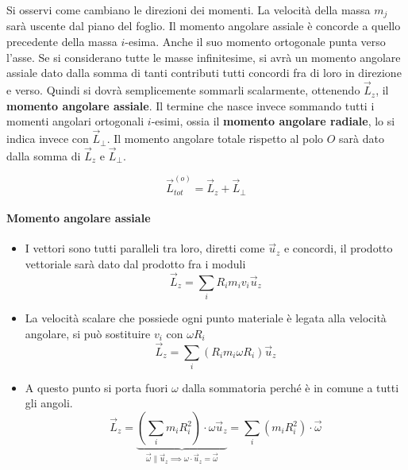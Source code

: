 \begin{figure}[htpb]
\end{figure}
\FloatBarrier
Si osservi come cambiano le direzioni dei momenti. La velocità della massa $m_j$ sarà uscente dal piano del foglio. Il momento angolare assiale è concorde a quello precedente della massa $i$-esima. Anche il suo momento ortogonale punta verso l'asse. Se si considerano tutte le masse infinitesime, si avrà un momento angolare assiale dato dalla somma di tanti contributi tutti concordi fra di loro in direzione e verso. Quindi si dovrà semplicemente sommarli scalarmente, ottenendo $\vec{L}_z$, il \textbf{momento angolare assiale}. Il termine che nasce invece sommando tutti i momenti angolari ortogonali $i$-esimi, ossia il \textbf{momento angolare radiale}, lo si indica invece con $\vec{L}_\perp$. Il momento angolare totale rispetto al polo $O$ sarà dato dalla somma di $\vec{L}_z$ e $\vec{L}_\perp$.

\[
	\boxed{\vec{L}_{tot}^{(o)} = \vec{L}_z + \vec{L}_{\bot}}
\]

\paragraph{Momento angolare assiale}

\begin{itemize}
	\item I vettori sono tutti paralleli tra loro, diretti come $\vec{u}_z$ e concordi, il prodotto vettoriale sarà dato dal prodotto fra i moduli
	\[
		\vec{L}_z = \sum_i R_i m_i v_i \vec{u}_z
	\]
	\item La velocità scalare che possiede ogni punto materiale è legata alla velocità angolare, si può sostituire $v_i$ con $\omega R_i$
	\[
		\vec{L}_z = \sum_i \left(R_i m_i\omega R_i \right) \vec{u}_z
	\]
	\item A questo punto si porta fuori $\omega$ dalla sommatoria perché è in comune a tutti gli angoli.
	\[
		\vec{L}_z = \underbrace{\left( \sum_i m_i R_i^2 \right) \cdot \omega \vec{u}_z}_{\vec{\omega} \parallel \vec{u}_z \implies \omega \cdot \vec{u}_z = \vec{\omega}} = \sum_i \left( m_i R_i^2  \right) \cdot \vec{\omega}
	\]
\end{itemize}

